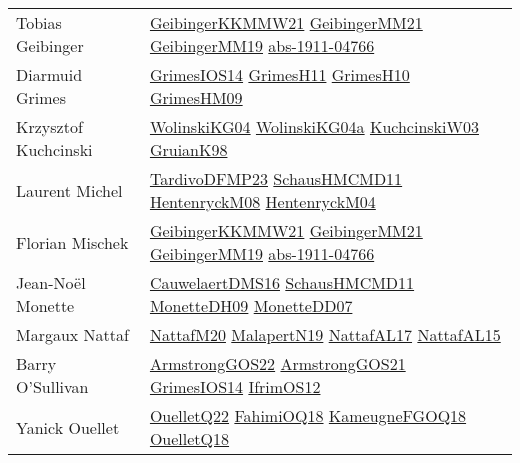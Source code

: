 {\begin{longtable}{p{4cm}p{20cm}}
Tobias Geibinger & \href{papers/GeibingerKKMMW21.pdf}{GeibingerKKMMW21}\cite{GeibingerKKMMW21} \href{papers/GeibingerMM21.pdf}{GeibingerMM21}\cite{GeibingerMM21} \href{papers/GeibingerMM19.pdf}{GeibingerMM19}\cite{GeibingerMM19} \href{articles/abs-1911-04766.pdf}{abs-1911-04766}\cite{abs-1911-04766} \\
Diarmuid Grimes & \href{articles/GrimesIOS14.pdf}{GrimesIOS14}\cite{GrimesIOS14} \href{papers/GrimesH11.pdf}{GrimesH11}\cite{GrimesH11} \href{papers/GrimesH10.pdf}{GrimesH10}\cite{GrimesH10} \href{papers/GrimesHM09.pdf}{GrimesHM09}\cite{GrimesHM09} \\
Krzysztof Kuchcinski & \href{papers/WolinskiKG04.pdf}{WolinskiKG04}\cite{WolinskiKG04} \href{}{WolinskiKG04a}\cite{WolinskiKG04a} \href{articles/KuchcinskiW03.pdf}{KuchcinskiW03}\cite{KuchcinskiW03} \href{papers/GruianK98.pdf}{GruianK98}\cite{GruianK98} \\
Laurent Michel & \href{papers/TardivoDFMP23.pdf}{TardivoDFMP23}\cite{TardivoDFMP23} \href{articles/SchausHMCMD11.pdf}{SchausHMCMD11}\cite{SchausHMCMD11} \href{papers/HentenryckM08.pdf}{HentenryckM08}\cite{HentenryckM08} \href{papers/HentenryckM04.pdf}{HentenryckM04}\cite{HentenryckM04} \\
Florian Mischek & \href{papers/GeibingerKKMMW21.pdf}{GeibingerKKMMW21}\cite{GeibingerKKMMW21} \href{papers/GeibingerMM21.pdf}{GeibingerMM21}\cite{GeibingerMM21} \href{papers/GeibingerMM19.pdf}{GeibingerMM19}\cite{GeibingerMM19} \href{articles/abs-1911-04766.pdf}{abs-1911-04766}\cite{abs-1911-04766} \\
Jean{-}No{\"{e}}l Monette & \href{papers/CauwelaertDMS16.pdf}{CauwelaertDMS16}\cite{CauwelaertDMS16} \href{articles/SchausHMCMD11.pdf}{SchausHMCMD11}\cite{SchausHMCMD11} \href{papers/MonetteDH09.pdf}{MonetteDH09}\cite{MonetteDH09} \href{papers/MonetteDD07.pdf}{MonetteDD07}\cite{MonetteDD07} \\
Margaux Nattaf & \href{papers/NattafM20.pdf}{NattafM20}\cite{NattafM20} \href{papers/MalapertN19.pdf}{MalapertN19}\cite{MalapertN19} \href{articles/NattafAL17.pdf}{NattafAL17}\cite{NattafAL17} \href{articles/NattafAL15.pdf}{NattafAL15}\cite{NattafAL15} \\
Barry O'Sullivan & \href{papers/ArmstrongGOS22.pdf}{ArmstrongGOS22}\cite{ArmstrongGOS22} \href{papers/ArmstrongGOS21.pdf}{ArmstrongGOS21}\cite{ArmstrongGOS21} \href{articles/GrimesIOS14.pdf}{GrimesIOS14}\cite{GrimesIOS14} \href{papers/IfrimOS12.pdf}{IfrimOS12}\cite{IfrimOS12} \\
Yanick Ouellet & \href{papers/OuelletQ22.pdf}{OuelletQ22}\cite{OuelletQ22} \href{articles/FahimiOQ18.pdf}{FahimiOQ18}\cite{FahimiOQ18} \href{papers/KameugneFGOQ18.pdf}{KameugneFGOQ18}\cite{KameugneFGOQ18} \href{papers/OuelletQ18.pdf}{OuelletQ18}\cite{OuelletQ18} \\

\end{longtable}}
